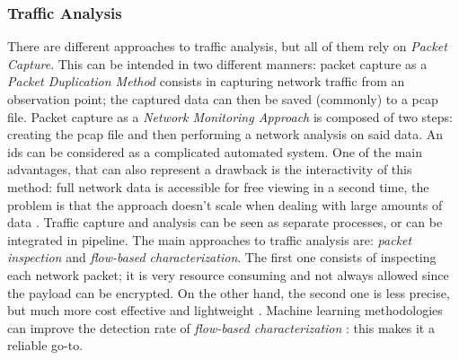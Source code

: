 \subsubsection{Traffic Analysis}
\label{subsubsec:traffic-analysis}

There are different approaches to traffic analysis, but all of them rely on \textit{Packet Capture}. This can be intended in two different manners: packet capture as a \textit{Packet Duplication Method} consists in capturing network traffic from an observation point; the captured data can then be saved (commonly) to a \gls{pcap} file. Packet capture as a \textit{Network Monitoring Approach} is composed of two steps: creating the \gls{pcap} file and then performing a network analysis on said data. An \gls{ids} can be considered as a complicated automated system. One of the main advantages, that can also represent a drawback is the interactivity of this method: full network data is accessible for free viewing in a second time, the problem is that the approach doesn't scale when dealing with large amounts of data \cite{Svoboda2015}. Traffic capture and analysis can be seen as separate processes, or can be integrated in pipeline. The main approaches to traffic analysis are: \textit{packet inspection} and \textit{flow-based characterization}. The first one consists of inspecting each network packet; it is very resource consuming and not always allowed since the payload can be encrypted. On the other hand, the second one is less precise, but much more cost effective and lightweight \cite{Alaidaros2017}. Machine learning methodologies can improve the detection rate of \textit{flow-based characterization} \cite{Iglesias2015}: this makes it a reliable go-to.

